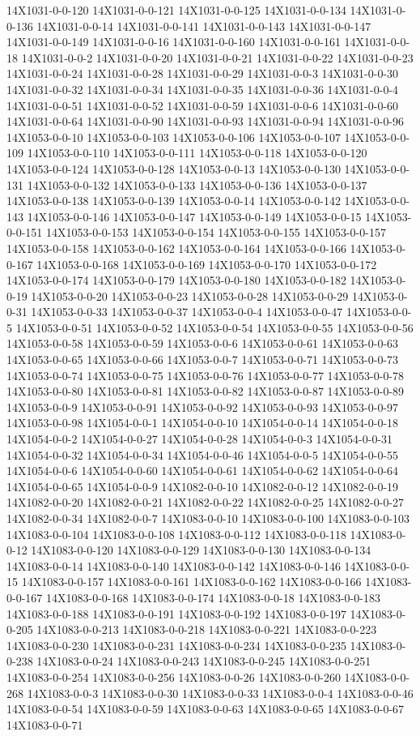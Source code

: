 \documentclass[
]{book}
\begin{document}
14X1031-0-0-120 14X1031-0-0-121 14X1031-0-0-125 14X1031-0-0-134 14X1031-0-0-136 14X1031-0-0-14 14X1031-0-0-141 14X1031-0-0-143 14X1031-0-0-147 14X1031-0-0-149 14X1031-0-0-16 14X1031-0-0-160 14X1031-0-0-161 14X1031-0-0-18 14X1031-0-0-2 14X1031-0-0-20 14X1031-0-0-21 14X1031-0-0-22 14X1031-0-0-23 14X1031-0-0-24 14X1031-0-0-28 14X1031-0-0-29 14X1031-0-0-3 14X1031-0-0-30 14X1031-0-0-32 14X1031-0-0-34 14X1031-0-0-35 14X1031-0-0-36 14X1031-0-0-4 14X1031-0-0-51 14X1031-0-0-52 14X1031-0-0-59 14X1031-0-0-6 14X1031-0-0-60 14X1031-0-0-64 14X1031-0-0-90 14X1031-0-0-93 14X1031-0-0-94 14X1031-0-0-96 14X1053-0-0-10 14X1053-0-0-103 14X1053-0-0-106 14X1053-0-0-107 14X1053-0-0-109 14X1053-0-0-110 14X1053-0-0-111 14X1053-0-0-118 14X1053-0-0-120 14X1053-0-0-124 14X1053-0-0-128 14X1053-0-0-13 14X1053-0-0-130 14X1053-0-0-131 14X1053-0-0-132 14X1053-0-0-133 14X1053-0-0-136 14X1053-0-0-137 14X1053-0-0-138 14X1053-0-0-139 14X1053-0-0-14 14X1053-0-0-142 14X1053-0-0-143 14X1053-0-0-146 14X1053-0-0-147 14X1053-0-0-149 14X1053-0-0-15 14X1053-0-0-151 14X1053-0-0-153 14X1053-0-0-154 14X1053-0-0-155 14X1053-0-0-157 14X1053-0-0-158 14X1053-0-0-162 14X1053-0-0-164 14X1053-0-0-166 14X1053-0-0-167 14X1053-0-0-168 14X1053-0-0-169 14X1053-0-0-170 14X1053-0-0-172 14X1053-0-0-174 14X1053-0-0-179 14X1053-0-0-180 14X1053-0-0-182 14X1053-0-0-19 14X1053-0-0-20 14X1053-0-0-23 14X1053-0-0-28 14X1053-0-0-29 14X1053-0-0-31 14X1053-0-0-33 14X1053-0-0-37 14X1053-0-0-4 14X1053-0-0-47 14X1053-0-0-5 14X1053-0-0-51 14X1053-0-0-52 14X1053-0-0-54 14X1053-0-0-55 14X1053-0-0-56 14X1053-0-0-58 14X1053-0-0-59 14X1053-0-0-6 14X1053-0-0-61 14X1053-0-0-63 14X1053-0-0-65 14X1053-0-0-66 14X1053-0-0-7 14X1053-0-0-71 14X1053-0-0-73 14X1053-0-0-74 14X1053-0-0-75 14X1053-0-0-76 14X1053-0-0-77 14X1053-0-0-78 14X1053-0-0-80 14X1053-0-0-81 14X1053-0-0-82 14X1053-0-0-87 14X1053-0-0-89 14X1053-0-0-9 14X1053-0-0-91 14X1053-0-0-92 14X1053-0-0-93 14X1053-0-0-97 14X1053-0-0-98 14X1054-0-0-1 14X1054-0-0-10 14X1054-0-0-14 14X1054-0-0-18 14X1054-0-0-2 14X1054-0-0-27 14X1054-0-0-28 14X1054-0-0-3 14X1054-0-0-31 14X1054-0-0-32 14X1054-0-0-34 14X1054-0-0-46 14X1054-0-0-5 14X1054-0-0-55 14X1054-0-0-6 14X1054-0-0-60 14X1054-0-0-61 14X1054-0-0-62 14X1054-0-0-64 14X1054-0-0-65 14X1054-0-0-9 14X1082-0-0-10 14X1082-0-0-12 14X1082-0-0-19 14X1082-0-0-20 14X1082-0-0-21 14X1082-0-0-22 14X1082-0-0-25 14X1082-0-0-27 14X1082-0-0-34 14X1082-0-0-7 14X1083-0-0-10 14X1083-0-0-100 14X1083-0-0-103 14X1083-0-0-104 14X1083-0-0-108 14X1083-0-0-112 14X1083-0-0-118 14X1083-0-0-12 14X1083-0-0-120 14X1083-0-0-129 14X1083-0-0-130 14X1083-0-0-134 14X1083-0-0-14 14X1083-0-0-140 14X1083-0-0-142 14X1083-0-0-146 14X1083-0-0-15 14X1083-0-0-157 14X1083-0-0-161 14X1083-0-0-162 14X1083-0-0-166 14X1083-0-0-167 14X1083-0-0-168 14X1083-0-0-174 14X1083-0-0-18 14X1083-0-0-183 14X1083-0-0-188 14X1083-0-0-191 14X1083-0-0-192 14X1083-0-0-197 14X1083-0-0-205 14X1083-0-0-213 14X1083-0-0-218 14X1083-0-0-221 14X1083-0-0-223 14X1083-0-0-230 14X1083-0-0-231 14X1083-0-0-234 14X1083-0-0-235 14X1083-0-0-238 14X1083-0-0-24 14X1083-0-0-243 14X1083-0-0-245 14X1083-0-0-251 14X1083-0-0-254 14X1083-0-0-256 14X1083-0-0-26 14X1083-0-0-260 14X1083-0-0-268 14X1083-0-0-3 14X1083-0-0-30 14X1083-0-0-33 14X1083-0-0-4 14X1083-0-0-46 14X1083-0-0-54 14X1083-0-0-59 14X1083-0-0-63 14X1083-0-0-65 14X1083-0-0-67 14X1083-0-0-71 
\end{document}
